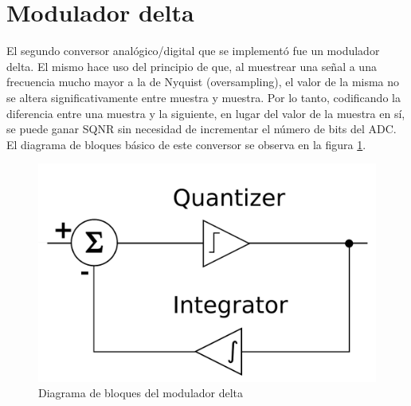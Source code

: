 \documentclass[assd_tp3_main.tex]{subfiles}
\begin{document}
\section{Modulador delta}

El segundo conversor anal\'ogico/digital que se implement\'o fue un modulador delta. El mismo hace uso del principio de que, al muestrear una se\~nal a una frecuencia mucho mayor a la de Nyquist (oversampling), el valor de la misma no se altera significativamente entre muestra y muestra. Por lo tanto, codificando la diferencia entre una muestra y la siguiente, en lugar del valor de la muestra en s\'i, se puede ganar SQNR sin necesidad de incrementar el n\'umero de bits del ADC. El diagrama de bloques b\'asico de este conversor se observa en la figura \ref{fig:delta-bloques}.

\begin{figure}[htb]
	\centering
	\includegraphics[width=0.6 \textwidth]
	{imagenes/ej3/delta-bloques.png}
	\caption{Diagrama de bloques del modulador delta}
	\label{fig:delta-bloques}
\end{figure}
\end{document}
